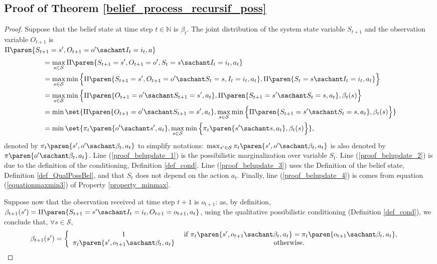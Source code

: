 \subsection{Proof of Theorem \ref{belief_process_recursif_poss}}
\label{belief_process_recursif_poss_RETURN}
\begin{proof}
Suppose that the belief state at time step $t \in \mathbb{N}$
is $\beta_t$.
The joint distribution of the system state variable $S_{t+1}$
and the observation variable $O_{t+1}$ is
\\
$\Pi \paren{ S_{t+1} = s', O_{t+1} = o' \sachant I_{t} = i_{t}, a }$
\begin{align}
\label{proof_belupdate_1} &= \max_{s \in \mathcal{S}} \Pi \paren{ S_{t+1} = s', O_{t+1}= o', S_{t} = s \sachant I_{t} = i_{t}, a_t }\\
\label{proof_belupdate_2} &= \max_{s \in \mathcal{S}} \min \Big\{ \Pi \paren{ S_{t+1} = s', O_{t+1}= o' \sachant S_{t} = s, I_{t} = i_{t}, a_t }, \Pi \paren{ S_{t} = s \sachant I_{t} = i_{t}, a_t } \Big\}\\
\label{proof_belupdate_3} & = \max_{s \in \mathcal{S}} \min \Big\{ \Pi \paren{O_{t+1}= o' \sachant S_{t+1} = s', a_t}, \Pi \paren{ S_{t+1} = s' \sachant S_{t} = s, a_t }, \beta_t(s) \Big\}\\
\label{proof_belupdate_4} & = \min \set{ \Pi \paren{O_{t+1}= o' \sachant S_{t+1} = s', a_t},  \max_{s \in \mathcal{S}} \min \Big\{ \Pi \paren{ S_{t+1} = s' \sachant S_{t} = s, a_t }, \beta_t(s) \Big\} }\\
\nonumber & = \min \set{ \pi_{t} \paren{o' \sachant s', a_t},  \max_{s \in \mathcal{S}} \min \Big\{ \pi_t \paren{ s' \sachant s, a_t }, \beta_t(s) \Big\} },
\end{align}
denoted by $\pi_t \paren{ s', o' \sachant \beta_t, a_t}$ to simplify notations:
$\max_{s' \in \mathcal{S}} \pi_t \paren{ s', o' \sachant \beta_t, a_t}$ is also denoted by $\pi \paren{ o' \sachant \beta_t, a_t}$.
Line (\ref{proof_belupdate_1}) is the possibilistic marginalization over variable $S_t$. 
Line (\ref{proof_belupdate_2}) is due to the definition of the conditioning, Definition \ref{def_cond}. 
Line (\ref{proof_belupdate_3}) uses the Definition of the belief state, Definition \ref{def_QualPossBel},
and that $S_t$ does not depend on the action $a_t$.
Finally, line (\ref{proof_belupdate_4}) is comes from equation (\ref{equationmaxmin3}) of Property \ref{property_minmax}.

Suppose now that the observation received at time step $t+1$ is $o_{t+1}$:  
as, by definition, $\beta_{t+1}(s') = \Pi \paren{ S_{t+1} = s' \sachant I_{t} = i_{t}, O_{t+1} = o_{t+1}, a_t }$,
using the qualitative possibilistic conditioning (Definition \ref{def_cond}),
we conclude that, $\forall s \in \mathcal{S}$,
\begin{align*}
\beta_{t+1}(s') &= \left \{ \begin{array}{ccc}
1 & \mbox{ if } \pi_t \paren{ s', o_{t+1} \sachant \beta_t, a_t}= \pi_t \paren{ o_{t+1} \sachant \beta_t,a_t }, \\
\pi_t \paren{ s', o_{t+1} \sachant \beta_t, a_t} & \mbox{ otherwise. } 
\end{array} \right. 
\end{align*}
\end{proof}
